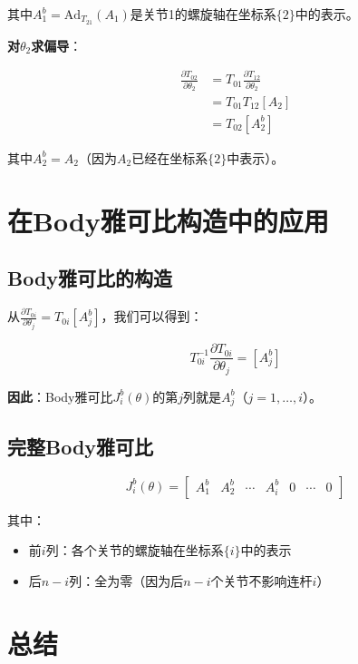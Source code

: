 \documentclass[12pt,a4paper]{article}
\begin{document}
其中$A_1^b = \text{Ad}_{T_{21}}(A_1)$是关节1的螺旋轴在坐标系$\{2\}$中的表示。

\textbf{对$\theta_2$求偏导}：

\begin{align}
\frac{\partial T_{02}}{\partial \theta_2} &= T_{01} \frac{\partial T_{12}}{\partial \theta_2} \\
&= T_{01} T_{12} [A_2] \\
&= T_{02} [A_2^b]
\end{align}

其中$A_2^b = A_2$（因为$A_2$已经在坐标系$\{2\}$中表示）。

\section{在Body雅可比构造中的应用}

\subsection{Body雅可比的构造}

从$\frac{\partial T_{0i}}{\partial \theta_j} = T_{0i} [A_j^b]$，我们可以得到：

\begin{equation}
T_{0i}^{-1} \frac{\partial T_{0i}}{\partial \theta_j} = [A_j^b]
\end{equation}

\textbf{因此}：Body雅可比$J_i^b(\theta)$的第$j$列就是$A_j^b$（$j = 1, \ldots, i$）。

\subsection{完整Body雅可比}

\begin{equation}
J_i^b(\theta) = \begin{bmatrix} A_1^b & A_2^b & \cdots & A_i^b & 0 & \cdots & 0 \end{bmatrix}
\end{equation}

其中：
\begin{itemize}
\item 前$i$列：各个关节的螺旋轴在坐标系$\{i\}$中的表示
\item 后$n-i$列：全为零（因为后$n-i$个关节不影响连杆$i$）
\end{itemize}

\section{总结}
\end{document}

